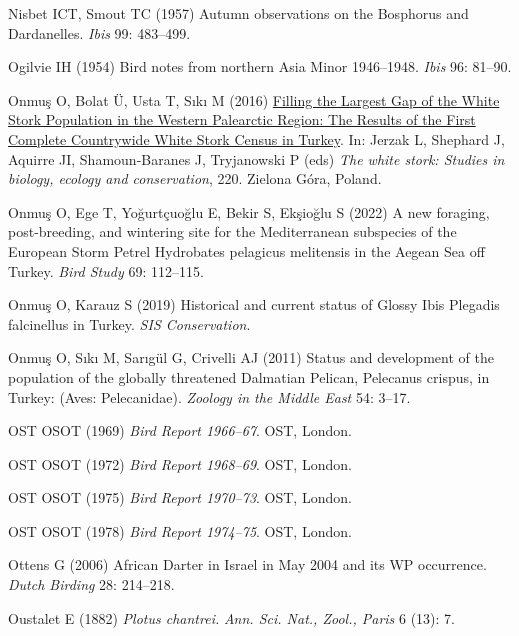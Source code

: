 \documentclass[
  letterpaper,
  DIV=11,
  numbers=noendperiod]{scrreprt}
\newlength{\cslhangindent}
\newenvironment{CSLReferences}[2] %
 {\begin{list}{}{%
  \setlength{\itemindent}{0pt}
  \setlength{\leftmargin}{0pt}
  \setlength{\parsep}{0pt}
  \ifodd #1
   \setlength{\leftmargin}{\cslhangindent}
   \setlength{\itemindent}{-1\cslhangindent}
  \fi
  \setlength{\itemsep}{#2\baselineskip}}}
 {\end{list}}
\begin{document}
\begin{CSLReferences}{0}{1}
Nisbet ICT, Smout TC (1957) {Autumn observations on the Bosphorus and
Dardanelles}. \emph{Ibis} 99: 483--499.

Ogilvie IH (1954) {Bird notes from northern Asia Minor 1946--1948}.
\emph{Ibis} 96: 81--90.

Onmuş O, Bolat Ü, Usta T, Sıkı M (2016)
\href{https://doi.org/10.13140/2.1.3377.6001}{{Filling the Largest Gap
of the White Stork Population in the Western Palearctic Region: The
Results of the First Complete Countrywide White Stork Census in
Turkey}}. In: Jerzak L, Shephard J, Aquirre JI, Shamoun-Baranes J,
Tryjanowski P (eds) \emph{The white stork: Studies in biology, ecology
and conservation}, 220. Zielona Góra, Poland.

Onmuş O, Ege T, Yoğurtçuoğlu E, Bekir S, Ekşioğlu S (2022) {A new
foraging, post-breeding, and wintering site for the Mediterranean
subspecies of the European Storm Petrel Hydrobates pelagicus melitensis
in the Aegean Sea off Turkey}. \emph{Bird Study} 69: 112--115.

Onmuş O, Karauz S (2019) {Historical and current status of Glossy Ibis
Plegadis falcinellus in Turkey}. \emph{SIS Conservation}.

Onmuş O, Sıkı M, Sarıgül G, Crivelli AJ (2011) {Status and development
of the population of the globally threatened Dalmatian Pelican,
Pelecanus crispus, in Turkey: (Aves: Pelecanidae)}. \emph{Zoology in the
Middle East} 54: 3--17.

OST OSOT (1969) \emph{{Bird Report 1966--67}}. OST, London.

OST OSOT (1972) \emph{{Bird Report 1968--69}}. OST, London.

OST OSOT (1975) \emph{{Bird Report 1970--73}}. OST, London.

OST OSOT (1978) \emph{{Bird Report 1974--75}}. OST, London.

Ottens G (2006) {African Darter in Israel in May 2004 and its WP
occurrence}. \emph{Dutch Birding} 28: 214--218.

Oustalet E (1882) {\emph{Plotus chantrei.}} \emph{Ann. Sci. Nat., Zool.,
Paris} 6 (13): 7.


\end{CSLReferences}
\end{document}
